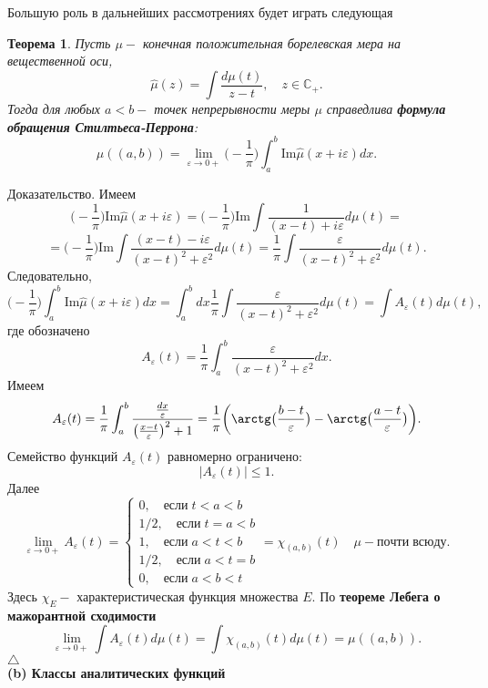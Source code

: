 \documentclass[12pt,a4paper]{article}
\theoremstyle{plain}   \newtheorem{Pro}{Задача}
\newtheorem{The}{Теорема}
\begin{document}
Большую роль в дальнейших рассмотрениях будет играть следующая
\begin{The}
Пусть
$ \mu - $
конечная положительная борелевская мера на вещественной оси,
$$
  \hat \mu (z) = \int \frac{d \mu (t)}{z-t},
  \quad z \in \mathbb{C}_+ .
$$
Тогда для любых
$ a<b - $
точек непрерывности меры
$ \mu $
справедлива
{\bfseries формула обращения Стилтьеса-Перрона}:
$$
  \mu ((a,b)) = \lim _{\varepsilon \rightarrow 0+}
  \bigl ( - \frac{1}{\pi} \bigr )
  \int _a ^b \mathrm{Im} \hat \mu (x+i \varepsilon ) dx.
$$
\end{The}
{\Large Доказательство.}
Имеем
$$
  \bigl ( - \frac{1}{\pi} \bigr )
  \mathrm{Im} \hat \mu (x+i \varepsilon ) =
  \bigl ( - \frac{1}{\pi} \bigr )
  \mathrm{Im} \int \frac{1}{(x-t)+i \varepsilon } d \mu (t) =
$$
$$
  =\bigl (-\frac{1}{\pi} \bigr )
  \mathrm{Im} \int \frac{(x-t)-i \varepsilon}{(x-t)^2 + \varepsilon ^2}
  d \mu (t) = \frac{1}{\pi} \int
  \frac{\varepsilon}{(x-t)^2 +\varepsilon ^2}d \mu (t).
$$
Следовательно,
$$
  \bigl ( - \frac{1}{\pi} \bigr ) \int _a ^b
  \mathrm{Im} \hat \mu (x+i \varepsilon )dx=
  \int _a ^b dx \frac{1}{\pi} \int
  \frac{\varepsilon}{(x-t)^2 +\varepsilon ^2} d \mu (t) =
  \int A_{\varepsilon}(t) d \mu (t) ,
$$
где обозначено
$$
  A_{\varepsilon}(t) = \frac{1}{\pi} \int _a ^b
  \frac{\varepsilon}{(x-t)^2 +\varepsilon ^2}dx.
$$
Имеем
$$
  A_{\varepsilon}(t)= \frac{1}{\pi} \int _a ^b
  \frac{\frac{dx}{\varepsilon}}{\bigl (
  \frac{x-t}{\varepsilon} \bigr ) ^2 +1 } =
  \frac{1}{\pi} \biggl ( \arctg \bigl (
  \frac{b-t}{\varepsilon} \bigr ) -
  \arctg \bigl ( \frac{a-t}{\varepsilon} \bigr ) \biggr ).
$$
Семейство функций
$ A_{\varepsilon}(t) $
равномерно ограничено:
$$
  |A_{\varepsilon}(t)| \leq 1.
$$
Далее
\begin{equation*}
  \lim _{\varepsilon \rightarrow 0+} A_{\varepsilon}(t) =
    \begin{cases}
	  0, \quad если \; t<a<b \\
	  1/2, \quad если \; t=a<b \\
	  1, \quad если \; a<t<b \\
	  1/2, \quad если \; a<t=b \\
	  0, \quad если \; a<b<t
	\end{cases}
  = \chi _{(a,b)}(t) \quad \mu - почти \; всюду.
\end{equation*}
Здесь
$ \chi _E - $
характеристическая функция множества
$ E . $
По
{\bfseries теореме Лебега о мажорантной сходимости}
$$
  \lim _{\varepsilon \rightarrow 0+}
  \int A_{\varepsilon}(t) d \mu (t) =
  \int \chi _{(a,b)}(t) d \mu (t) =
  \mu ((a,b)).
$$
$ \triangle $
$$ \; $$
{\bfseries (b) Классы аналитических функций}\\
\end{document}
